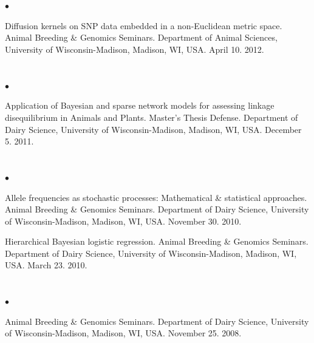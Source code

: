 \documentclass[margin,line,10pt]{res}
\newenvironment{list2}{
  \begin{list}{$\bullet$}{%
      \setlength{\itemsep}{0in}
      \setlength{\parsep}{0in} \setlength{\parskip}{0in}
      \setlength{\topsep}{0in} \setlength{\partopsep}{0in} 
      \setlength{\leftmargin}{0.2in}}}{\end{list}}
\begin{document}
\begin{resume}
\section{}
\begin{list2}
 \item [{\bf 5}.] Diffusion kernels on SNP data embedded in a non-Euclidean metric space. Animal Breeding \& Genomics Seminars.  Department of Animal Sciences, University of Wisconsin-Madison, Madison, WI, USA. April 10. 2012. 
\end{list2}  

\section{}
\begin{list2}
\item  [{\bf 4}.] Application of Bayesian and sparse network models for assessing linkage disequilibrium in Animals and Plants. Master's Thesis Defense.  Department of Dairy Science, University of Wisconsin-Madison, Madison, WI, USA. December 5. 2011. 
\end{list2}  

\section{}
\begin{list2}
\item [{\bf 3}.] Allele frequencies as stochastic processes: Mathematical \& statistical approaches. Animal Breeding \& Genomics Seminars.  Department of Dairy Science, University of Wisconsin-Madison, Madison, WI, USA. November 30. 2010.

\vspace{0.5cm}
\item [{\bf 2}.] Hierarchical Bayesian logistic regression. Animal Breeding \& Genomics Seminars. Department of Dairy Science, University of Wisconsin-Madison, Madison, WI, USA. March 23. 2010.
\end{list2}

\section{}
\begin{list2}
\item  [{\bf 1}.] Animal Breeding \& Genomics Seminars.  Department of Dairy Science, University of Wisconsin-Madison, Madison, WI, USA. November 25. 2008. 
\end{list2}





\end{resume}
\end{document}
